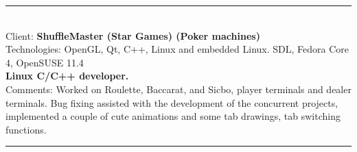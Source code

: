 \documentclass{article}
\begin{document}




%


\noindent\hfil\rule{0.5\textwidth}{.4pt}\hfil
\\

Client: 	\textbf  {ShuffleMaster  (Star Games)   (Poker machines) } \\
Technologies: 	OpenGL, Qt, C++, Linux and embedded Linux. SDL, Fedora Core 4, OpenSUSE 11.4 \\
\textbf{ Linux C/C++ developer. } \\
Comments:	Worked on Roulette, Baccarat, and Sicbo, player terminals and 
		dealer terminals.  Bug fixing assisted with the development of the concurrent
		projects, implemented a couple of cute animations and some tab drawings,
		tab switching functions. \\


\noindent\hfil\rule{0.5\textwidth}{.4pt}\hfil
\\

\end{document}
